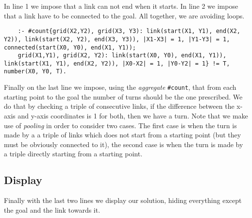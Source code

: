 In line 1 we  impose that a link can not end when it starts. In line 2 we impose that a link have to be connected to the goal. All together, we are avoiding loops.

\begin{verbatim}
    :- #count{grid(X2,Y2), grid(X3, Y3): link(start(X1, Y1), end(X2, Y2)), link(start(X2, Y2), end(X3, Y3)), |X1-X3| = 1, |Y1-Y3| = 1, connected(start(X0, Y0), end(X1, Y1));
    grid(X1,Y1), grid(X2, Y2): link(start(X0, Y0), end(X1, Y1)), link(start(X1, Y1), end(X2, Y2)), |X0-X2| = 1, |Y0-Y2| = 1} != T, number(X0, Y0, T).
\end{verbatim}

Finally on the last line we impose, using the \emph{aggregate} \texttt{#count}, that from each starting point to the goal the number of turns should be the one prescribed. We do that by checking a triple of consecutive links, if the difference between the x-axis and y-axis coordinates is 1 for both, then we have a turn.
 Note that we make use of \emph{pooling} in order to consider two cases. The first case is when the turn is made by a a triple of links which does not start from a starting point (but they must be obviously connected to it), the second case is when the turn is made by a triple directly starting from a starting point.

\subsection{Display}

Finally with the last two lines we display our solution, hiding everything except the goal and the link towards it.
